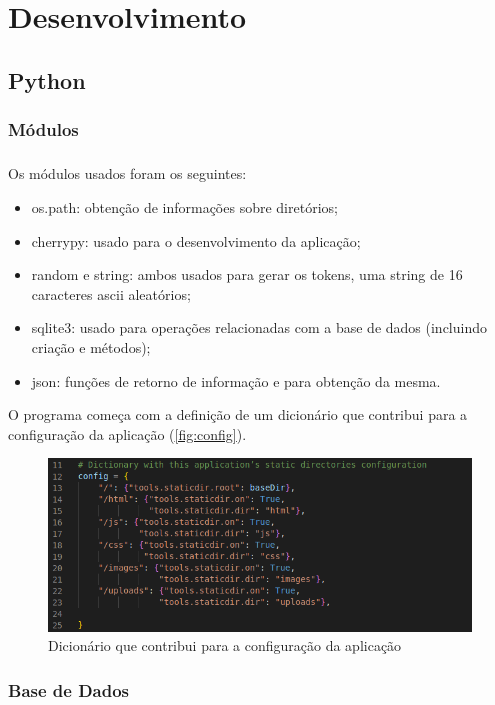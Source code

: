 \documentclass[a4paper, 11pt, oneside]{report}
\begin{document}
\clearpage

\chapter{Desenvolvimento}

\section{Python}

\subsection{Módulos}
\paragraph{} Os módulos usados foram os seguintes:
\begin{itemize}
	\item os.path: obtenção de informações sobre diretórios;
	\item cherrypy: usado para o desenvolvimento da aplicação;
	\item random e string: ambos usados para gerar os tokens, uma string de 16 caracteres \acs{ascii} aleatórios;
	\item sqlite3: usado para operações relacionadas com a base de dados (incluindo criação e métodos);
	\item json: funções de retorno de informação e para obtenção da mesma.
\end{itemize}

\indent O programa começa com a definição de um dicionário que contribui para a configuração da aplicação (\autoref{fig:config}).

\begin{figure}[h]
\center
\includegraphics[width=320pt]{configDIC.png}
\caption{Dicionário que contribui para a configuração da aplicação}
\label{fig:config}
\end{figure}

\subsection{Base de Dados}
\end{document}

